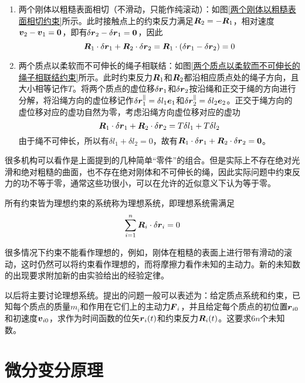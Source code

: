 \begin{enumerate}
\item 两个刚体以粗糙表面相切（不滑动，只能作纯滚动）：如图\ref{两个刚体以粗糙表面相切约束}所示。此时接触点上的约束反力满足$\boldsymbol{R}_2 =- \boldsymbol{R}_1$，相对速度$\boldsymbol{v}_2-\boldsymbol{v}_1= \boldsymbol{0}$，即有$\delta \boldsymbol{r}_2-\delta \boldsymbol{r}_1 = \boldsymbol{0}$，因此
\begin{equation*}
	\boldsymbol{R}_1 \cdot \delta \boldsymbol{r}_1 + \boldsymbol{R}_2 \cdot \delta \boldsymbol{r}_2 = \boldsymbol{R}_1 \cdot (\delta \boldsymbol{r}_1 - \delta \boldsymbol{r}_2) = 0
\end{equation*}
\item 两个质点以柔软而不可伸长的绳子相联结：如图\ref{两个质点以柔软而不可伸长的绳子相联结约束}所示。此时约束反力$\boldsymbol{R}_1$和$\boldsymbol{R}_2$都沿相应质点处的绳子方向，且大小相等记作$T$。将两个质点的虚位移$\delta \boldsymbol{r}_1$和$\delta \boldsymbol{r}_2$按沿绳和正交于绳的方向进行分解，将沿绳方向的虚位移记作$\delta \boldsymbol{r}_1^\parallel = \delta l_1\boldsymbol{e}_1$和$\delta \boldsymbol{r}_2^\parallel = \delta l_2 \boldsymbol{e}_2$。正交于绳方向的虚位移对应的虚功自然为零，考虑沿绳方向虚位移对应的虚功
\begin{equation*}
	\boldsymbol{R}_1 \cdot \delta \boldsymbol{r}_1 + \boldsymbol{R}_2 \cdot \delta \boldsymbol{r}_2 = T\delta l_1 + T\delta l_2
\end{equation*}
由于绳不可伸长，所以有$\delta l_1 + \delta l_2 = 0$，故有$\boldsymbol{R}_1 \cdot \delta \boldsymbol{r}_1 + \boldsymbol{R}_2 \cdot \delta \boldsymbol{r}_2 = \boldsymbol{0}$。
\end{enumerate}

很多机构可以看作是上面提到的几种简单“零件”的组合。但是实际上不存在绝对光滑和绝对粗糙的曲面，也不存在绝对刚体和不可伸长的绳，因此实际问题中约束反力的功不等于零，通常这些功很小，可以在允许的近似意义下认为等于零。

所有约束皆为理想约束的系统称为{\heiti 理想系统}，即理想系统需满足
\begin{equation*}
	\sum_{i=1}^n \boldsymbol{R}_i \cdot \delta \boldsymbol{r}_i = 0
\end{equation*}

很多情况下约束不能看作理想的，例如，刚体在粗糙的表面上进行带有滑动的滚动，这时仍然可以将约束看作理想的，而将摩擦力看作未知的主动力。新的未知数的出现要求附加新的由实验给出的经验定律。

以后将主要讨论理想系统。提出的问题一般可以表述为：给定质点系统和约束，已知每个质点的质量$m_i$和作用在它们上的主动力$\boldsymbol{F}_i$，并且给定每个质点的初位置$\boldsymbol{r}_{i0}$和初速度$\boldsymbol{v}_{i0}$，求作为时间函数的位矢$\boldsymbol{r}_i(t)$和约束反力$\boldsymbol{R}_i(t)$。这要求$6n$个未知数。

\section{微分变分原理}\label{chapter2:section-微分变分原理}

